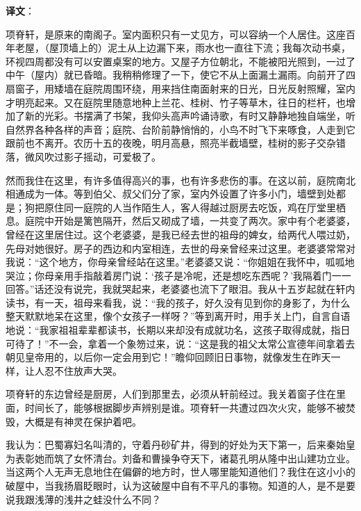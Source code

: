 \documentclass[12pt,UTF-8,openany,a4]{ctexbook}
\begin{document}
\newpage

\begin{Large}
   \noindent \textbf{译文}：
\end{Large}

\vspace{1em}

\begin{large}\yiwen
    
    项脊轩，是原来的南阁子。室内面积只有一丈见方，可以容纳一个人居住。这座百年老屋，（屋顶墙上的）泥土从上边漏下来，雨水也一直往下流；我每次动书桌，环视四周都没有可以安置桌案的地方。又屋子方位朝北，不能被阳光照到，一过了中午（屋内）就已昏暗。我稍稍修理了一下，使它不从上面漏土漏雨。向前开了四扇窗子，用矮墙在庭院周围环绕，用来挡住南面射来的日光，日光反射照耀，室内才明亮起来。又在庭院里随意地种上兰花、桂树、竹子等草木，往日的栏杆，也增加了新的光彩。书摆满了书架，我仰头高声吟诵诗歌，有时又静静地独自端坐，听自然界各种各样的声音；庭院、台阶前静悄悄的，小鸟不时飞下来啄食，人走到它跟前也不离开。农历十五的夜晚，明月高悬，照亮半截墙壁，桂树的影子交杂错落，微风吹过影子摇动，可爱极了。
    
    然而我住在这里，有许多值得高兴的事，也有许多悲伤的事。在这以前，庭院南北相通成为一体。等到伯父、叔父们分了家，室内外设置了许多小门，墙壁到处都是；狗把原住同一庭院的人当作陌生人，客人得越过厨房去吃饭，鸡在厅堂里栖息。庭院中开始是篱笆隔开，然后又砌成了墙，一共变了两次。家中有个老婆婆，曾经在这里居住过。这个老婆婆，是我已经去世的祖母的婢女，给两代人喂过奶，先母对她很好。房子的西边和内室相连，去世的母亲曾经来过这里。老婆婆常常对我说：“这个地方，你母亲曾经站在这里。”老婆婆又说：“你姐姐在我怀中，呱呱地哭泣；你母亲用手指敲着房门说：‘孩子是冷呢，还是想吃东西呢？’我隔着门一一回答。”话还没有说完，我就哭起来，老婆婆也流下了眼泪。我从十五岁起就在轩内读书，有一天，祖母来看我，说：“我的孩子，好久没有见到你的身影了，为什么整天默默地呆在这里，像个女孩子一样呀？”等到离开时，用手关上门，自言自语地说：“我家祖祖辈辈都读书，长期以来却没有成就功名，这孩子取得成就，指日可待了！”不一会，拿着一个象笏过来，说：“这是我的祖父太常公宣德年间拿着去朝见皇帝用的，以后你一定会用到它！”瞻仰回顾旧日事物，就像发生在昨天一样，让人忍不住放声大哭。
    
    项脊轩的东边曾经是厨房，人们到那里去，必须从轩前经过。我关着窗子住在里面，时间长了，能够根据脚步声辨别是谁。项脊轩一共遭过四次火灾，能够不被焚毁，大概是有神灵在保护着吧。
    
    我认为：巴蜀寡妇名叫清的，守着丹砂矿井，得到的好处为天下第一，后来秦始皇为表彰她而筑了女怀清台。刘备和曹操争夺天下，诸葛孔明从隆中出山建功立业。当这两个人无声无息地住在偏僻的地方时，世人哪里能知道他们？我住在这小小的破屋中，当我扬眉眨眼时，认为这破屋中自有不平凡的事物。知道的人，是不是要说我跟浅薄的浅井之蛙没什么不同？
    

\end{large}
\end{document}
